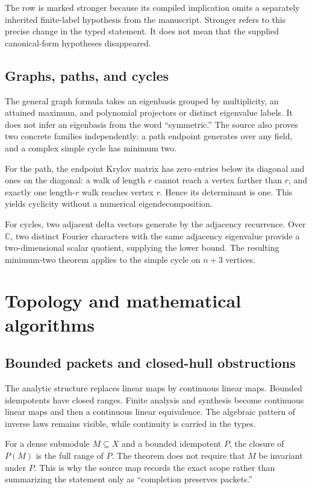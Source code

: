 \documentclass[11pt,a4paper]{article}
\begin{document}
The row is marked stronger because its compiled implication omits a separately inherited finite-label hypothesis from the manuscript. Stronger refers to this precise change in the typed statement. It does not mean that the supplied canonical-form hypotheses disappeared.

\subsection{Graphs, paths, and cycles}

The general graph formula takes an eigenbasis grouped by multiplicity, an attained maximum, and polynomial projectors or distinct eigenvalue labels. It does not infer an eigenbasis from the word ``symmetric.'' The source also proves two concrete families independently: a path endpoint generates over any field, and a complex simple cycle has minimum two.

For the path, the endpoint Krylov matrix has zero entries below its diagonal and ones on the diagonal: a walk of length $r$ cannot reach a vertex farther than $r$, and exactly one length-$r$ walk reaches vertex $r$. Hence its determinant is one. This yields cyclicity without a numerical eigendecomposition.

For cycles, two adjacent delta vectors generate by the adjacency recurrence. Over $\mathbb C$, two distinct Fourier characters with the same adjacency eigenvalue provide a two-dimensional scalar quotient, supplying the lower bound. The resulting minimum-two theorem applies to the simple cycle on $n+3$ vertices.

\section{Topology and mathematical algorithms}

\subsection{Bounded packets and closed-hull obstructions}

The analytic structure replaces linear maps by continuous linear maps. Bounded idempotents have closed ranges. Finite analysis and synthesis become continuous linear maps and then a continuous linear equivalence. The algebraic pattern of inverse laws remains visible, while continuity is carried in the types.

For a dense submodule $M\subseteq X$ and a bounded idempotent $P$, the closure of $P(M)$ is the full range of $P$. The theorem does not require that $M$ be invariant under $P$. This is why the source map records the exact scope rather than summarizing the statement only as ``completion preserves packets.''
\end{document}
